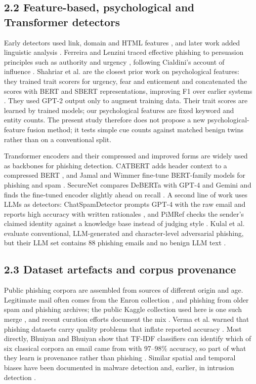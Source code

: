 \documentclass[11pt,letterpaper]{article}
\begin{document}
\subsection{2.2 Feature-based, psychological and Transformer detectors}

Early detectors used link, domain and HTML features \cite{fette2007}, and later work added linguistic analysis \cite{verma2012}. Ferreira and Lenzini traced effective phishing to persuasion principles such as authority and urgency \cite{ferreira2015}, following Cialdini's account of influence \cite{cialdini2006influence}. Shahriar et al. are the closest prior work on psychological features: they trained trait scorers for urgency, fear and enticement and concatenated the scores with BERT and SBERT representations, improving F1 over earlier systems \cite{shahriar2022}. They used GPT-2 output only to augment training data. Their trait scores are learned by trained models; our psychological features are fixed keyword and entity counts. The present study therefore does not propose a new psychological-feature fusion method; it tests simple cue counts against matched benign twins rather than on a conventional split.

Transformer encoders \cite{vaswani2017,devlin2019} and their compressed and improved forms \cite{sanh2019,liu2019,he2021} are widely used as backbones for phishing detection. CATBERT adds header context to a compressed BERT \cite{lee2020}, and Jamal and Wimmer fine-tune BERT-family models for phishing and spam \cite{jamal2023}. SecureNet compares DeBERTa with GPT-4 and Gemini and finds the fine-tuned encoder slightly ahead on recall \cite{mahendru2024}. A second line of work uses LLMs as detectors: ChatSpamDetector prompts GPT-4 with the raw email and reports high accuracy with written rationales \cite{koide2025}, and PiMRef checks the sender's claimed identity against a knowledge base instead of judging style \cite{liu2025}. Kulal et al. evaluate conventional, LLM-generated and character-level adversarial phishing, but their LLM set contains 88 phishing emails and no benign LLM text \cite{kulal2025}.

\subsection{2.3 Dataset artefacts and corpus provenance}

Public phishing corpora are assembled from sources of different origin and age. Legitimate mail often comes from the Enron collection \cite{klimt2004}, and phishing from older spam and phishing archives; the public Kaggle collection used here is one such merge \cite{subaiey2024}, and recent curation efforts document the mix \cite{champa2024,mendes2025}. Verma et al. warned that phishing datasets carry quality problems that inflate reported accuracy \cite{verma2019}. Most directly, Bhuiyan and Bhuiyan show that TF-IDF classifiers can identify which of six classical corpora an email came from with 97--98\% accuracy, so part of what they learn is provenance rather than phishing \cite{bhuiyan2026}. Similar spatial and temporal biases have been documented in malware detection \cite{pendlebury2019} and, earlier, in intrusion detection \cite{sommer2010}.
\end{document}
